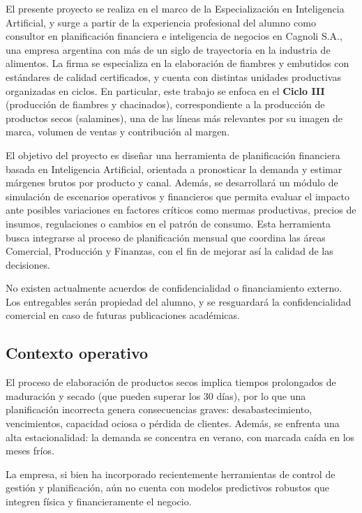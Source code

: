 \documentclass[
11pt, %
]{charter}
\begin{document}
El presente proyecto se realiza en el marco de la Especialización en Inteligencia Artificial, y surge a partir de la experiencia profesional del alumno como consultor en planificación financiera e inteligencia de negocios en Cagnoli S.A., una empresa argentina con más de un siglo de trayectoria en la industria de alimentos. La firma se especializa en la elaboración de fiambres y embutidos con estándares de calidad certificados, y cuenta con distintas unidades productivas organizadas en ciclos. En particular, este trabajo se enfoca en el \textbf{Ciclo III} (producción de fiambres y chacinados), correspondiente a la producción de productos secos (salamines), una de las líneas más relevantes por su imagen de marca, volumen de ventas y contribución al margen.

El objetivo del proyecto es diseñar una herramienta de planificación financiera basada en Inteligencia Artificial, orientada a pronosticar la demanda y estimar márgenes brutos por producto y canal. Además, se desarrollará un módulo de simulación de escenarios operativos y financieros que permita evaluar el impacto ante posibles variaciones en factores críticos como mermas productivas, precios de insumos, regulaciones o cambios en el patrón de consumo. Esta herramienta busca integrarse al proceso de planificación mensual que coordina las áreas Comercial, Producción y Finanzas, con el fin de mejorar así la calidad de las decisiones.

No existen actualmente acuerdos de confidencialidad o financiamiento externo. Los entregables serán propiedad del alumno, y se resguardará la confidencialidad comercial en caso de futuras publicaciones académicas.

\subsection*{Contexto operativo}
El proceso de elaboración de productos secos implica tiempos prolongados de maduración y secado (que pueden superar los 30 días), por lo que una planificación incorrecta genera consecuencias graves: desabastecimiento, vencimientos, capacidad ociosa o pérdida de clientes. Además, se enfrenta una alta estacionalidad: la demanda se concentra en verano, con marcada caída en los meses fríos. 

La empresa, si bien ha incorporado recientemente herramientas de control de gestión y planificación, aún no cuenta con modelos predictivos robustos que integren física y financieramente el negocio.
\end{document}
